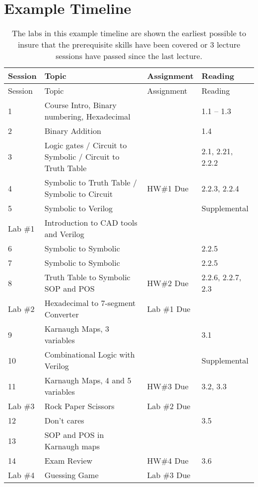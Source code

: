 \section{Example Timeline}

\begin{longtable}{|l|m{7cm}|l|l|}
\caption{The labs in this example timeline are shown the earliest possible
to insure that the prerequisite skills have been covered or 3 lecture sessions
have passed since the last lecture.}
\label{table:introTimeline}\tabularnewline
\toprule()
Session  & Topic & Assignment & Reading \\
\bottomrule()
\endfirsthead
\toprule()
Session  & Topic & Assignment & Reading \\
\endhead
1			&  Course Intro, Binary numbering, Hexadecimal & & 1.1 -- 1.3 \\ \hline
2			& Binary Addition & & 1.4 \\ \hline
3			& Logic gates / Circuit to Symbolic / Circuit to Truth Table & & 2.1, 2.21, 2.2.2 \\ \hline
4			& Symbolic to Truth Table / Symbolic to Circuit & HW\#1 Due & 2.2.3, 2.2.4 \\ \hline
5 			& Symbolic to Verilog & & Supplemental \\ \hline
 \rowcolor{yellow} 
Lab \#1	& Introduction to CAD tools and Verilog & & \\ \hline
6 			& Symbolic to Symbolic & & 2.2.5 \\ \hline
7 			& Symbolic to Symbolic & & 2.2.5 \\ \hline
8 			& Truth Table to Symbolic SOP and POS & HW\#2 Due & 2.2.6, 2.2.7, 2.3 \\ \hline
 \rowcolor{yellow} 
Lab \#2 	& Hexadecimal to 7-segment Converter & Lab \#1 Due & \\ \hline
9 			& Karnaugh Maps, 3 variables & & 3.1 \\ \hline
10			&  Combinational Logic with Verilog & & Supplemental \\ \hline
11 			& Karnaugh Maps, 4 and 5 variables & HW\#3 Due & 3.2, 3.3 \\ \hline
 \rowcolor{yellow} 
Lab \#3	& Rock Paper Scissors & Lab \#2 Due & \\ \hline
12 			& Don't cares & & 3.5 \\ \hline
13			& SOP and POS in Karnaugh maps & & \\ \hline
14 			& Exam Review & HW\#4 Due & 3.6 \\ \hline
 \rowcolor{yellow} 
Lab \#4 	& Guessing Game & Lab \#3 Due & \\ \hline

\end{longtable}
